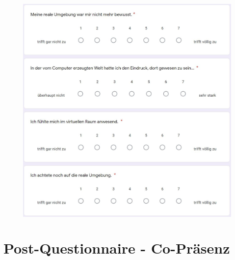 \documentclass[a4paper,11pt]{article}%
\renewcommand{\\}{\vspace*{0.5\baselineskip} \newline}
\begin{document}
	\begin{figure}[H]
	\centering
		\begin{footnotesize}
			\includegraphics[scale=0.6]{Abbildungen/Fragebogen/Post-Questionnaire/PQP3}
		\end{footnotesize}
	\end{figure}	

\newpage
\section{Post-Questionnaire - Co-Präsenz}			
\label{Post-Questionnaire - Co-Präsenz}		
\end{document}
